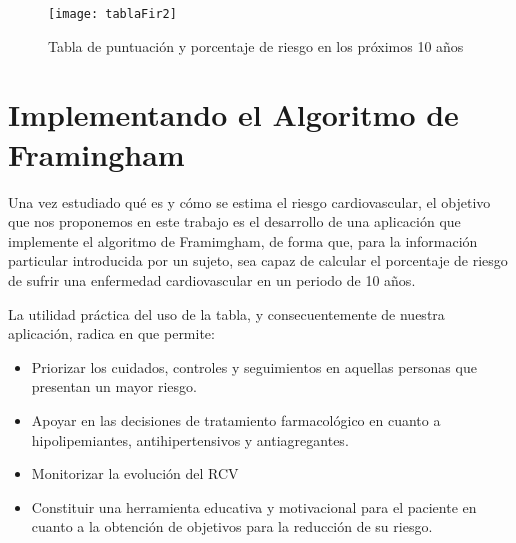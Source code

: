 \begin{figure}[htb]
	\centering
	\texttt{[image: tablaFir2]} 
	\caption[Predicción Framighan]{Tabla de puntuación y porcentaje de riesgo en los próximos 10 años \cite{tagle2007estimacion}
	}
	\label{fig:tablaFir2}
\end{figure}





\section{Implementando el Algoritmo de Framingham}
Una vez estudiado qué es y cómo se estima el riesgo cardiovascular, el objetivo que nos proponemos en este trabajo es el desarrollo de una aplicación que implemente el algoritmo de Framimgham, de forma que, para la información particular introducida por un sujeto, sea capaz de calcular el porcentaje de riesgo de sufrir una enfermedad cardiovascular en un periodo de 10 años. 

La utilidad práctica del uso de la tabla, y consecuentemente de nuestra aplicación, radica en que permite:
\begin{itemize}
\item Priorizar los cuidados, controles y seguimientos en aquellas personas que presentan un mayor riesgo.

\item Apoyar en las decisiones de tratamiento farmacológico en cuanto a hipolipemiantes, antihipertensivos y antiagregantes.

\item Monitorizar la evolución del RCV

\item Constituir una herramienta educativa y motivacional para el paciente en cuanto a la obtención de objetivos para la reducción de su riesgo.
\end{itemize}



